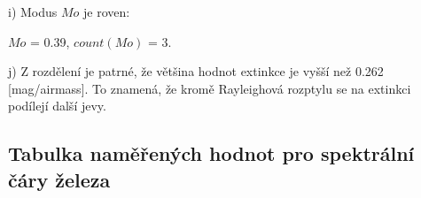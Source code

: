 \documentclass[a4paper,11pt]{article}
\begin{document}
\begin{minipage}[t]{0.5\textwidth}
        \par i) Modus $Mo$ je roven:
        \begin{center}
            $Mo$ = 0.39, $count(Mo)$ = 3.
        \end{center}

        \par j) Z rozdělení je patrné, že většina hodnot extinkce je vyšší než 0.262 [mag/airmass]. To znamená, že kromě Rayleighová rozptylu se na extinkci podílejí další jevy.
    \end{minipage}

    \begin{center}
            \section{Tabulka naměřených hodnot pro spektrální čáry železa}
    \end{center}
\end{document}
